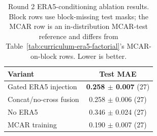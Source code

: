 \begin{table}[t]
  \centering
  \caption{Round 2 ERA5-conditioning ablation results. Block rows use block-missing test masks; the MCAR row is an in-distribution MCAR-test reference and differs from Table~\ref{tab:curriculum-era5-factorial}'s MCAR-on-block rows. Lower is better.}
  \label{tab:round2-ablations}
  \begin{tabular}{lc}
    \toprule
    Variant & Test MAE \\
    \midrule
    Gated ERA5 injection & \textbf{0.258 $\pm$ 0.007} (27) \\
    Concat/no-cross fusion & 0.258 $\pm$ 0.006 (27) \\
    No ERA5 & 0.346 $\pm$ 0.024 (27) \\
    \midrule
    MCAR training & 0.190 $\pm$ 0.007 (27) \\
    \bottomrule
  \end{tabular}
\end{table}
